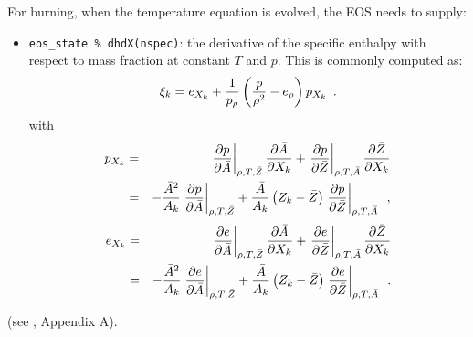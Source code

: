 For burning, when the temperature equation is evolved, the EOS
needs to supply:
\begin{itemize}
\item {\tt eos\_state \% dhdX(nspec)}: the derivative of the
  specific enthalpy with respect to mass fraction at constant
  $T$ and $p$.  This is commonly computed as:
  \begin{equation}
    \xi_k = e_{X_k} + \frac{1}{p_\rho} \left (\frac{p}{\rho^2} - e_\rho \right ) p_{X_k}\enskip .
  \end{equation}
  with
  \begin{eqnarray}
p_{X_k} &=& \left .\frac{\partial p}{\partial \bar{A}} \right |_{\rho, T, \bar{Z}}
          \frac{\partial \bar{A}}{\partial X_k} +
          \left . \frac{\partial p}{\partial \bar{Z}} \right |_{\rho, T, \bar{A}}
          \frac{\partial \bar{Z}}{\partial X_k} \nonumber \\
        &=& -\frac{\bar{A}^2}{A_k}
          \left .\frac{\partial p}{\partial \bar{A}} \right |_{\rho, T, \bar{Z}} +
          \frac{\bar{A}}{A_k} \left (Z_k - \bar{Z} \right )
          \left . \frac{\partial p}{\partial \bar{Z}} \right |_{\rho, T, \bar{A}}\enskip,
\end{eqnarray}
\begin{eqnarray}
e_{X_k} &=& \left . \frac{\partial e }{\partial \bar{A}} \right |_{\rho, T, \bar{Z}}
        \frac{\partial \bar{A}}{\partial X_k} +
        \left .\frac{\partial e}{\partial \bar{Z}} \right |_{\rho, T, \bar{A}}
        \frac{\partial \bar{Z}}{\partial X_k} \nonumber \\
        &=& -\frac{\bar{A}^2}{A_k}
        \left . \frac{\partial e }{\partial \bar{A}} \right |_{\rho, T, \bar{Z}} +
        \frac{\bar{A}}{A_k} \left (Z_k - \bar{Z}\right )
        \left .\frac{\partial e}{\partial \bar{Z}} \right |_{\rho, T, \bar{A}}\enskip.
\end{eqnarray}
\end{itemize}
(see \cite{maestro:III}, Appendix A).

